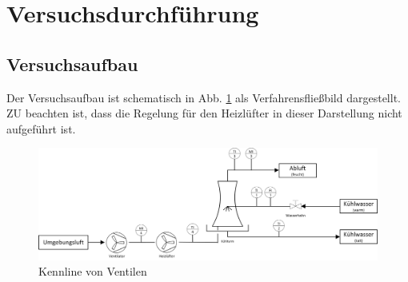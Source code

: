 \newpage
\section{Versuchsdurchführung}

\subsection{Versuchsaufbau}
Der Versuchsaufbau ist schematisch in Abb. \ref{fig:fliessbild} als Verfahrensfließbild dargestellt. ZU beachten ist, dass die Regelung für den Heizlüfter  in dieser Darstellung nicht aufgeführt ist.

\begin{figure}[h!]
	\centering
	\includegraphics[width=\textwidth]{img/fliessbild}
	\caption{Kennline von Ventilen}
	\label{fig:fliessbild}
\end{figure}
\FloatBarrier

